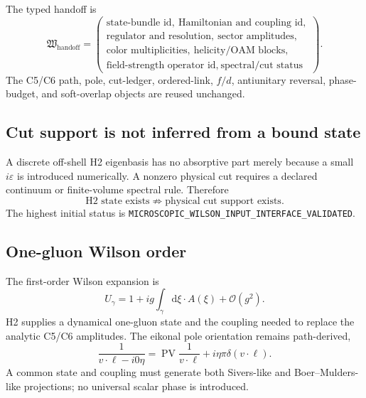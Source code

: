\documentclass[11pt]{article}
\newcommand{\dd}{\mathrm{d}}
\newcommand{\cO}{\mathcal O}
\newcommand{\eps}{\varepsilon}
\newcommand{\PV}{\operatorname{PV}}
\begin{document}
The typed handoff is
\begin{equation}
 \mathfrak W_{\mathrm{handoff}}
 =
 \left(
 \begin{array}{l}
 \text{state-bundle id},\ 
 \text{Hamiltonian and coupling id},\\
 \text{regulator and resolution},\ 
 \text{sector amplitudes},\\
 \text{color multiplicities},\ 
 \text{helicity/OAM blocks},\\
 \text{field-strength operator id},\ 
 \text{spectral/cut status}
 \end{array}
 \right).
 \label{eq:wilson-handoff}
\end{equation}
The C5/C6 path, pole, cut-ledger, ordered-link, \(f/d\), antiunitary reversal,
phase-budget, and soft-overlap objects are reused unchanged.

\subsection{Cut support is not inferred from a bound state}

A discrete off-shell H2 eigenbasis has no absorptive part merely because a
small \(i\eps\) is introduced numerically.  A nonzero physical cut requires a
declared continuum or finite-volume spectral rule.  Therefore
\begin{equation}
 \text{H2 state exists}
 \not\Longrightarrow
 \text{physical cut support exists}.
\end{equation}
The highest initial status is
\texttt{MICROSCOPIC\_WILSON\_INPUT\_INTERFACE\_VALIDATED}.

\subsection{One-gluon Wilson order}

The first-order Wilson expansion is
\begin{equation}
 U_\gamma
 =1+ig\int_\gamma\dd\xi\cdot A(\xi)+\cO(g^2).
\end{equation}
H2 supplies a dynamical one-gluon state and the coupling needed to replace the
analytic C5/C6 amplitudes.  The eikonal pole orientation remains path-derived,
\begin{equation}
 \frac{1}{v\cdot\ell-i0\eta}
 =
 \PV\frac{1}{v\cdot\ell}
 +i\eta\pi\delta(v\cdot\ell).
\end{equation}
A common state and coupling must generate both Sivers-like and Boer--Mulders-
like projections; no universal scalar phase is introduced.
\end{document}
